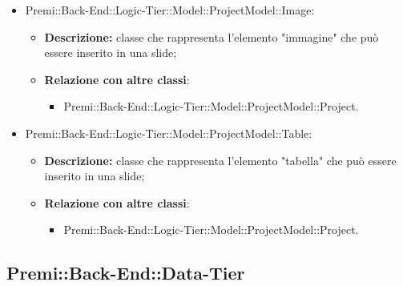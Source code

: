 \begin{itemize}
		\item Premi::Back-End::Logic-Tier::Model::ProjectModel::Image:
		\begin{itemize}
			\item \textbf{Descrizione:} classe che rappresenta l'elemento "immagine" che può essere inserito in una slide;
			\item \textbf{Relazione con altre classi}:
			\begin{itemize}
				\item Premi::Back-End::Logic-Tier::Model::ProjectModel::Project.
			\end{itemize}
		\end{itemize}
		
		\item Premi::Back-End::Logic-Tier::Model::ProjectModel::Table:
		\begin{itemize}
			\item \textbf{Descrizione:} classe che rappresenta l'elemento "tabella" che può essere inserito in una slide;
			\item \textbf{Relazione con altre classi}:
			\begin{itemize}
				\item Premi::Back-End::Logic-Tier::Model::ProjectModel::Project.
			\end{itemize}
		\end{itemize}
	\end{itemize}

\newpage

\subsection{Premi::Back-End::Data-Tier}
